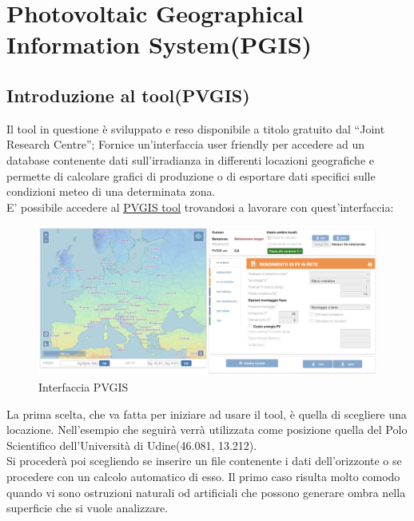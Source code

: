 
\chapter{Photovoltaic Geographical Information System(PGIS)}
\label{chp:Photovoltaic Geographical Information System(PGIS)}

\section{Introduzione al tool(PVGIS)}
Il tool in questione è sviluppato e reso disponibile a titolo gratuito dal \enquote{Joint Research Centre}; Fornice un'interfaccia user friendly per accedere ad un database contenente dati sull'irradianza in differenti locazioni geografiche e permette di calcolare grafici di produzione o di esportare dati specifici sulle condizioni meteo di una determinata zona.\\
E' possibile accedere al \href{https://re.jrc.ec.europa.eu/pvg_tools/it/}{\underline{PVGIS tool}} trovandosi a lavorare con quest'interfaccia:\\
\begin{figure}[H]
    \centering
    \includegraphics[height=0.5\textwidth]{res/cap 4/PGIS_schermata principale}
    \caption{Interfaccia PVGIS}
\end{figure}\noindent
La prima scelta, che va fatta per iniziare ad usare il tool, è quella di scegliere una locazione. Nell'esempio che seguirà verrà utilizzata come posizione quella del Polo Scientifico dell'Università di Udine(46.081, 13.212).\\
Si procederà poi scegliendo se inserire un file contenente i dati dell'orizzonte o se procedere con un calcolo automatico di esso.
Il primo caso risulta molto comodo quando vi sono ostruzioni naturali od artificiali che possono generare ombra nella superficie che si vuole analizzare.\\
